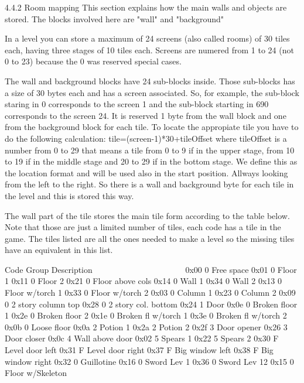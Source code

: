 4.4.2 Room mapping
 This section explains how the main walls and objects are stored. The
 blocks involved here are "wall" and "background"

 In a level you can store a maximum of 24 screens (also called rooms) of 30
 tiles each, having three stages of 10 tiles each. Screens are numered from
 1 to 24 (not 0 to 23) because the 0 was reserved special cases.

 The wall and background blocks have 24 sub-blocks inside. Those sub-blocks
 has a size of 30 bytes each and has a screen associated. So, for example,
 the sub-block staring in 0 corresponds to the screen 1 and the sub-block
 starting in 690 corresponds to the screen 24. 
 It is reserved 1 byte from the wall block and one from the background block
 for each tile. To locate the appropiate tile you have to do the following
 calculation: tile=(screen-1)*30+tileOffset where tileOffset is a number
 from 0 to 29 that means a tile from 0 to 9 if in the upper stage, from
 10 to 19 if in the middle stage and 20 to 29 if in the bottom stage.
 We define this as the location format and will be used also in the start
 position.
 Allways looking from the left to the right.
 So there is a wall and background byte for each tile in the level and this
 is stored this way.

 The wall part of the tile stores the main tile form according to the table
 below. Note that those are just a limited number of tiles, each code has a
 tile in the game. The tiles listed are all the ones needed to make a level
 so the missing tiles have an equivalent in this list.

  Code Group Description
  ~~~~ ~~~~~ ~~~~~~~~~~~
  0x00 0     Free space
  0x01 0     Floor 1
  0x11 0     Floor 2
  0x21 0     Floor above cols
  0x14 0     Wall 1
  0x34 0     Wall 2
  0x13 0     Floor w/torch 1  
  0x33 0     Floor w/torch 2     
  0x03 0     Column 1   
  0x23 0     Column 2   
  0x09 0     2 story column top
  0x28 0     2 story col. bottom
  0x24 1     Door
  0x0e 0     Broken floor 1
  0x2e 0     Broken floor 2
  0x1e 0     Broken fl w/torch 1
  0x3e 0     Broken fl w/torch 2
  0x0b 0     Loose floor
  0x0a 2     Potion 1
  0x2a 2     Potion 2    
  0x2f 3     Door opener
  0x26 3     Door closer
  0x0c 4     Wall above door
  0x02 5     Spears 1
  0x22 5     Spears 2
  0x30 F     Level door left
  0x31 F     Level door right
  0x37 F     Big window left
  0x38 F     Big window right
  0x32 0     Guillotine 
  0x16 0     Sword Lev 1
  0x36 0     Sword Lev 12
  0x15 0     Floor w/Skeleton
  
